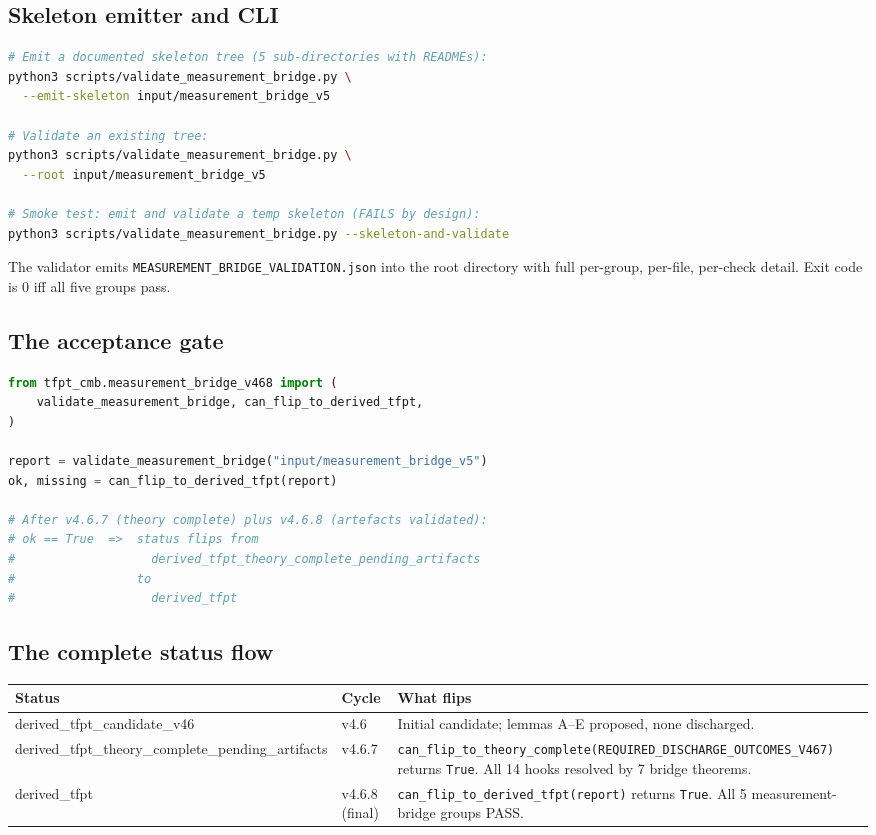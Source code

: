 \subsection{Skeleton emitter and CLI}

\begin{lstlisting}[language=bash]
# Emit a documented skeleton tree (5 sub-directories with READMEs):
python3 scripts/validate_measurement_bridge.py \
  --emit-skeleton input/measurement_bridge_v5

# Validate an existing tree:
python3 scripts/validate_measurement_bridge.py \
  --root input/measurement_bridge_v5

# Smoke test: emit and validate a temp skeleton (FAILS by design):
python3 scripts/validate_measurement_bridge.py --skeleton-and-validate
\end{lstlisting}

The validator emits \texttt{MEASUREMENT\_BRIDGE\_VALIDATION.json} into
the root directory with full per-group, per-file, per-check detail.
Exit code is 0 iff all five groups pass.

\subsection{The acceptance gate}

\begin{lstlisting}[language=Python]
from tfpt_cmb.measurement_bridge_v468 import (
    validate_measurement_bridge, can_flip_to_derived_tfpt,
)

report = validate_measurement_bridge("input/measurement_bridge_v5")
ok, missing = can_flip_to_derived_tfpt(report)

# After v4.6.7 (theory complete) plus v4.6.8 (artefacts validated):
# ok == True  =>  status flips from
#                   derived_tfpt_theory_complete_pending_artifacts
#                 to
#                   derived_tfpt
\end{lstlisting}

\subsection{The complete status flow}

\begin{center}
\renewcommand{\arraystretch}{1.18}
\begin{tabularx}{\textwidth}{@{}p{}lY@{}}
\toprule
\textbf{Status} & \textbf{Cycle} & \textbf{What flips} \\
\midrule
\textsf{derived\_tfpt\_candidate\_v46} & v4.6 &
Initial candidate; lemmas A--E proposed, none discharged. \\
\textsf{derived\_tfpt\_theory\_complete\_\allowbreak{}pending\_artifacts}
& v4.6.7 &
\texttt{can\_flip\_to\_theory\_complete(REQUIRED\_DISCHARGE\_OUTCOMES\_V467)} returns \texttt{True}. All 14 hooks resolved by 7 bridge theorems. \\
\textsf{derived\_tfpt} & v4.6.8 (final) &
\texttt{can\_flip\_to\_derived\_tfpt(report)} returns \texttt{True}.
All 5 measurement-bridge groups PASS. \\
\bottomrule
\end{tabularx}
\end{center}

